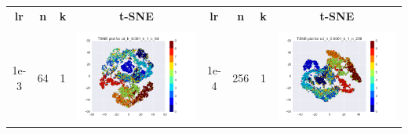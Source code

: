 \documentclass[12pt]{report}
\begin{document}
\begin{table}[H]
  \centering
  \begin{tabular}{ | c | c | c | c || c | c | c| c |}
    \hline
    \textbf{lr} & \textbf{n} & \textbf{k} & \textbf{t-SNE} & \textbf{lr} & \textbf{n} & \textbf{k} & \textbf{t-SNE} \\
     &  &  &  & & & & \\ \hline
    1e-3 & 64 & 1 &
    \begin{minipage}{.3\textwidth}
      \includegraphics[scale=0.25]{cd_lr_0_001_k_1_n_64.png}
    \end{minipage}
	&
    1e-4 & 256 & 1 &
    \begin{minipage}{.3\textwidth}
      \includegraphics[scale=0.25]{cd_lr_0_0001_k_1_n_256.png}

\end{minipage}
\end{tabular}
\end{table}
\end{document}
